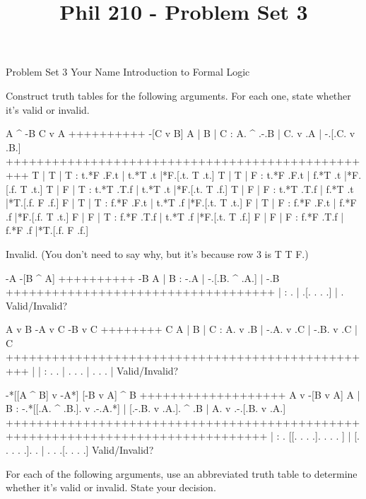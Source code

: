
\title{Phil 210 - Problem Set 3}

\heading
Problem Set 3
Your Name
Introduction to Formal Logic
\endheading

Construct truth tables for the following arguments. For each one, state whether it's valid or invalid.

\problems
{}
\argument
 A ^ -B
 C v A
++++++++++
 -[C v B]
\endargument
        \answer
        \truthtable
         A | B | C : A. ^ .-.B | C. v .A | -.[.C. v .B.]
        +++++++++++++++++++++++++++++++++++++++++++++++++
         T | T | T : t.*F .F.t | t.*T .t |*F.[.t. T .t.]
         T | T | F : t.*F .F.t | f.*T .t |*F.[.f. T .t.]
         T | F | T : t.*T .T.f | t.*T .t |*F.[.t. T .f.]
         T | F | F : t.*T .T.f | f.*T .t |*T.[.f. F .f.]
         F | T | T : f.*F .F.t | t.*T .f |*F.[.t. T .t.]
         F | T | F : f.*F .F.t | f.*F .f |*F.[.f. T .t.]
         F | F | T : f.*F .T.f | t.*T .f |*F.[.t. T .f.]
         F | F | F : f.*F .T.f | f.*F .f |*T.[.f. F .f.]
        \endtruthtable

        Invalid. (You don't need to say why, but it's because row 3 is T T F.)
        \endanswer

\argument
 -A
 -[B ^ A]
++++++++++
 -B
\endargument
        \answer
        \truthtable
         A | B : -.A | -.[.B. ^ .A.] | -.B
        +++++++++++++++++++++++++++++++++++
           |   :  .  |  .[. .   . .] |  . 
        \endtruthtable
        Valid/Invalid?
        \endanswer

\argument
 A v B
 -A v C
 -B v C
++++++++
 C
\endargument
        \answer
        \truthtable
         A | B | C : A. v .B | -.A. v .C | -.B. v .C | C
        +++++++++++++++++++++++++++++++++++++++++++++++++
           |   |   :  .   .  |  . .   .  |  . .   .  |  
        \endtruthtable
        Valid/Invalid?
        \endanswer

\argument
 -*[[A ^ B] v -A*]
 [-B v A] ^ B
+++++++++++++++++++
 A v -[B v A]
\endargument
        \answer
        \truthtable
         A | B : -.*[[.A. ^ .B.]. v .-.A.*] | [.-.B. v .A.]. ^ .B | A. v .-.[.B. v .A.]
        ++++++++++++++++++++++++++++++++++++++++++++++++++++++++++++++++++++++++++++++++
           |   :  . [[. .   . .].   . . . ] | [. . .   . .].   .  |  .   . .[. .   . .]
        \endtruthtable
        Valid/Invalid?
        \endanswer
\endproblems

For each of the following arguments, use an abbreviated truth table to determine whether it's valid or invalid. State your decision.

